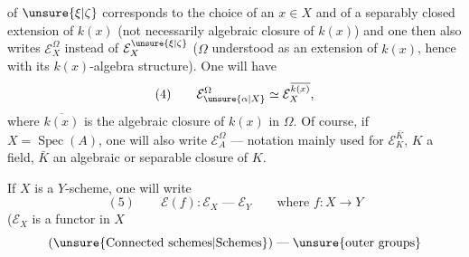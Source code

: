 of $\unsure{\xi|\zeta}$ corresponds to the choice of an $x\in X$ and of a separably closed extension  \inserted{$\Omega$} of $k(x)$ (not necessarily  algebraic closure of $k(x)$) and one then also writes $\mathcal E_X^\Omega$ instead of $\mathcal E_X^{\unsure{\xi|\zeta}}$ ($\Omega$ understood as an extension of $k(x)$, hence with its $k(x)$-algebra structure). One will have 
\[
(4)\qquad \mathcal E_{\unsure{\alpha|X}}^\Omega\simeq\mathcal E_X^{\overline{k(x)}},
\]
where $\overline{k(x)}$ is the algebraic closure of $k(x)$ in $\Omega$. Of course, if $X=\operatorname{Spec}(A)$, one will also write $\mathcal E_A^\Omega$ --- notation mainly used for $\mathcal E_K^{\bar K}$, $K$ a field, $\bar K$ an algebraic or separable closure of $K$.

If $X$ is a $Y$-scheme,  one will write
\[
(5)\qquad \mathcal E(f):\mathcal E_X\mathrel{\text{---}}\mathcal E_Y\qquad\text{where }f:X\longrightarrow Y
\]
($\mathcal E_X$ is a functor in $X$
\[
(\unsure{\text{Connected schemes}|\text{Schemes}})\mathrel{\text{---}}\unsure{\text{outer groups}}
\]
